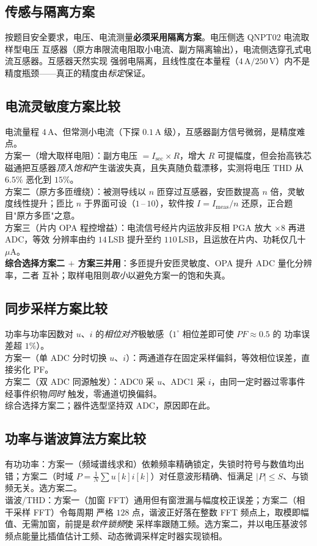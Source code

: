 \documentclass[12pt]{article}
\begin{document}
\subsection{传感与隔离方案}
按题目安全要求，电压、电流测量\textbf{必须采用隔离方案}。电压侧选 QNPT02 电流取样型电压
互感器（原方串限流电阻取小电流、副方隔离输出），电流侧选穿孔式电流互感器。互感器天然实现
强弱电隔离，且线性度在本量程（$4$\,A$/250$\,V）内不是精度瓶颈——真正的精度由\emph{标定}保证。

\subsection{电流灵敏度方案比较}
电流量程 $4$\,A、但常测小电流（下探 $0.1$\,A 级），互感器副方信号微弱，是精度难点。\\
方案一（增大取样电阻）：副方电压 $=I_{\text{sec}}\times R$，增大 $R$ 可提幅度，但会抬高铁芯
磁通把互感器\emph{顶入饱和}产生谐波失真，且失真随负载漂移，实测将电压 THD 从 $6.5\%$ 恶化到
$15\%$。\\
方案二（原方多匝缠绕）：被测导线以 $n$ 匝穿过互感器，安匝数提高 $n$ 倍，灵敏度线性提升；匝比
$n$ 于界面可设（$1$\,--\,$10$），软件按 $I=I_{\text{meas}}/n$ 还原，正合题目"原方多匝"之意。\\
方案三（片内 OPA 程控增益）：电流信号经片内运放非反相 PGA 放大 $\times 8$ 再进 ADC，等效
分辨率由约 $14$\,LSB 提升至约 $110$\,LSB，且运放在片内、功耗仅几十 $\mu$A。\\
\textbf{综合选择方案二 $+$ 方案三并用}：多匝提升安匝灵敏度、OPA 提升 ADC 量化分辨率，二者
互补；取样电阻则\emph{取小}以避免方案一的饱和失真。

\subsection{同步采样方案比较}
功率与功率因数对 $u$、$i$ 的\emph{相位对齐}极敏感（$1^\circ$ 相位差即可使 $PF\!\approx\!0.5$ 的
功率误差超 $1\%$）。\\
方案一（单 ADC 分时切换 $u$、$i$）：两通道存在固定采样偏斜，等效相位误差，直接劣化 PF。\\
方案二（双 ADC 同源触发）：ADC0 采 $u$、ADC1 采 $i$，由同一定时器过零事件经事件织物\emph{同时}
触发，零通道切换偏斜。\\
综合选择方案二；器件选型坚持双 ADC，原因即在此。

\subsection{功率与谐波算法方案比较}
有功功率：方案一（频域谱线求和）依赖频率精确锁定，失锁时符号与数值均出错；方案二（时域
$P=\frac{1}{N}\sum u[k]i[k]$）对任意波形精确、恒满足 $|P|\le S$、与锁频无关。选方案二。\\
谐波/THD：方案一（加窗 FFT）通用但有窗泄漏与幅度校正误差；方案二（相干采样 FFT）令每周期
严格 $128$ 点，谐波正好落在整数 FFT 频点上，取模即幅值、无需加窗，前提是\emph{软件锁频}使
采样率跟随工频。选方案二，并以电压基波邻频点能量比插值估计工频、动态微调采样定时器实现锁相。
\end{document}
